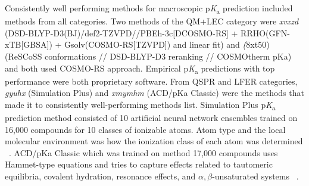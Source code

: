 \documentclass[9pt,lineno,final]{elife}
\newcommand{\pKa}{p\textit{K}\textsubscript{a}}
\begin{document}
Consistently well performing methods for macroscopic \pKa{} prediction included methods from all categories. Two methods of the QM+LEC category were \textit{xvxzd} (DSD-BLYP-D3(BJ)/def2-TZVPD//PBEh-3c[DCOSMO-RS] + RRHO(GFN-xTB[GBSA]) + Gsolv(COSMO-RS[TZVPD]) and linear fit) and \textit(8xt50) (ReSCoSS conformations // DSD-BLYP-D3 reranking // COSMOtherm pKa) and both used COSMO-RS approach. 
Empirical \pKa{} predictions with top performance were both proprietary software. 
From QSPR and LFER categories, \textit{gyuhx} (Simulation Plus) and \textit{xmymhm} (ACD/pKa Classic) were the methods that made it to consistently well-performing methods list. Simulation Plus \pKa{} prediction method consisted of 10 artificial neural network ensembles trained on 16,000 compounds for 10 classes of ionizable atoms. Atom type and the local molecular environment was how the ionization class of each atom was determined ~\citep{simulation_plus_D3R_presentation}. 
ACD/pKa Classic which was trained on method 17,000 compounds uses Hammet-type equations and tries to capture effects related to tautomeric equilibria, covalent hydration, resonance effects, and  $\alpha, \beta$-unsaturated systems ~\citep{ACD-pKa-classic}.
\end{document}
